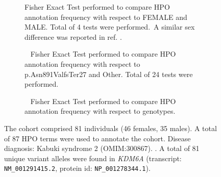 \begin{figure}[htbp]
\begin{subfigure}[b]{0.95\textwidth}
\centering
{}
\captionsetup{justification=raggedright,singlelinecheck=false}
\caption{Fisher Exact Test performed to compare HPO annotation frequency with respect to FEMALE and MALE. Total of 4 tests were performed. A similar sex difference was reported in ref. \cite{PMID_33674768}.}
\end{subfigure}
\vspace{2em}
\begin{subfigure}[b]{0.95\textwidth}
\centering
{}
\captionsetup{justification=raggedright,singlelinecheck=false}
\caption{         Fisher Exact Test performed to compare HPO annotation frequency with respect to p.Asn891ValfsTer27 and Other. Total of
        24 tests were performed. }
\end{subfigure}
\vspace{2em}
\begin{subfigure}[b]{0.95\textwidth}
\centering
{}
\captionsetup{justification=raggedright,singlelinecheck=false}
\caption{             Fisher Exact Test performed to compare HPO annotation frequency with respect to genotypes. }
\end{subfigure}

\vspace{2em}

\caption{ The cohort comprised 81 individuals (46 females, 35 males). A total of 87 HPO terms were used to annotate the cohort. Disease diagnosis: Kabuki syndrome 2 (OMIM:300867). . A total of 81 unique variant alleles were found in \textit{KDM6A} (transcript: \texttt{NM\_001291415.2}, protein id: \texttt{NP\_001278344.1}).}
\end{figure}
